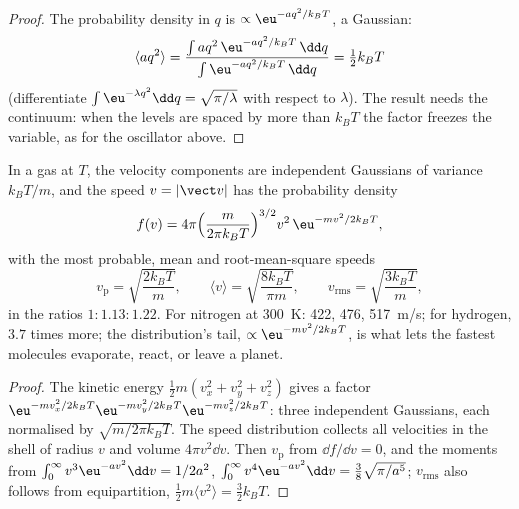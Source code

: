\begin{proof}
The probability density in $q$ is $\propto\eu^{-aq^2/k_BT}$, a Gaussian:
\[
\langle aq^2\rangle = \frac{\int aq^2\,\eu^{-aq^2/k_BT}\,\dd q}{\int\eu^{-aq^2/k_BT}\,\dd q} = \tfrac12k_BT
\]
(differentiate $\int\eu^{-\lambda q^2}\dd q = \sqrt{\pi/\lambda}$ with respect to
$\lambda$). The result needs the continuum: when the
levels are spaced by more than $k_BT$ the factor freezes the variable,
as for the oscillator above.
\end{proof}

\begin{theorem}\label{thm:b2:boltzmann-factor:maxwell}
In a gas at $T$, the velocity components are independent Gaussians of
variance $k_BT/m$, and the speed $v = |\vect v|$ has the probability
density
\[
f(v) = 4\pi\Big(\frac{m}{2\pi k_BT}\Big)^{3/2}v^2\,\eu^{-mv^2/2k_BT} ,
\]
with the most probable, mean and root-mean-square speeds
\[
v_{\text{p}} = \sqrt{\frac{2k_BT}{m}}, \qquad
\langle v\rangle = \sqrt{\frac{8k_BT}{\pi m}}, \qquad
v_{\text{rms}} = \sqrt{\frac{3k_BT}{m}} ,
\]
in the ratios $1 : 1.13 : 1.22$. For nitrogen at \qty{300}{K}: \qty{422}{},
\qty{476}{}, \qty{517}{m/s}; for hydrogen, $3.7$ times more; the
distribution's tail, $\propto\eu^{-mv^2/2k_BT}$, is what lets the
fastest molecules evaporate, react, or leave a planet.
\end{theorem}

\begin{proof}
The kinetic energy $\tfrac12m(v_x^2 + v_y^2 + v_z^2)$ gives a factor
$\eu^{-mv_x^2/2k_BT}\eu^{-mv_y^2/2k_BT}\eu^{-mv_z^2/2k_BT}$: three independent
Gaussians, each normalised by $\sqrt{m/2\pi k_BT}$. The speed
distribution collects all velocities in the shell of radius $v$ and
volume $4\pi v^2\dd v$. Then $v_{\text{p}}$ from $\dd f/\dd v = 0$, and the
moments from $\int_0^\infty v^3\eu^{-av^2}\dd v = 1/2a^2$, $\int_0^\infty
v^4\eu^{-av^2}\dd v = \tfrac38\sqrt{\pi/a^5}$; $v_{\text{rms}}$ also follows
from equipartition, $\tfrac12m\langle v^2\rangle = \tfrac32k_BT$.
\end{proof}

